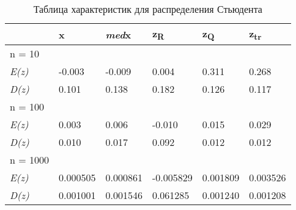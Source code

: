 \begin{table}[H]
    \centering
    \begin{tabular}{|l|l|l|l|l|l|}
    \hline
        &  x &   \textit{med}x   &   z\textsubscript{R}  &   z\textsubscript{Q}  &   z\textsubscript{tr}\\ \hline \hline
         n = 10& & & & & \\ \hline
         \textit{E(z)} & -0.003 & -0.009 & 0.004 & 0.311 & 0.268 \\ \hline
         \textit{D(z)} & 0.101       &       0.138       &       0.182     &        0.126      &        0.117 \\ \hline
       \hline
         n = 100& & & & & \\ \hline
         \textit{E(z)} & 0.003       &        0.006      &       -0.010       &        0.015       &        0.029  \\ \hline
         \textit{D(z)} &  0.010       &        0.017       &        0.092      &        0.012       &        0.012  \\ \hline
        \hline
         n = 1000& & & & & \\ \hline
         \textit{E(z)} &  0.000505       &       0.000861       &       -0.005829       &        0.001809       &       0.003526  \\ \hline
         \textit{D(z)} & 0.001001       &       0.001546       &        0.061285       &        0.001240        &       0.001208 \\ \hline
    \end{tabular}
     \caption{Таблица характеристик для распределения Стьюдента}
    \label{tab:my_label}
\end{table}
